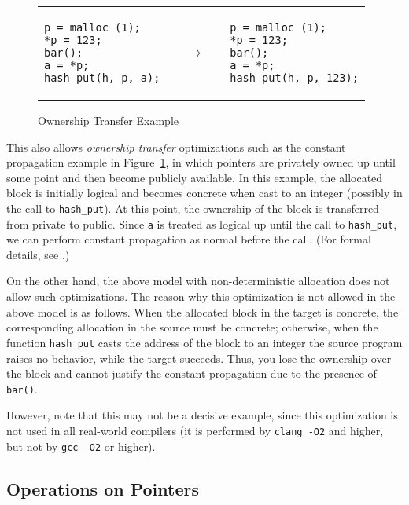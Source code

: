 \begin{figure}[t]
\center
\begin{tabular}{lll}
\begin{lstlisting}
p = malloc (1);
*p = 123;
bar();
a = *p;
hash_put(h, p, a);
\end{lstlisting}
&
$\quad\rightarrow\quad$
&
\begin{lstlisting}
p = malloc (1);
*p = 123;
bar();
a = *p;
hash_put(h, p, 123);
\end{lstlisting}
\end{tabular}
\caption{Ownership Transfer Example}\label{code:ownership}
\end{figure}

This also allows \emph{ownership transfer} optimizations such as the
constant propagation example in Figure~\ref{code:ownership}, in which
pointers are privately owned up until some point and then become
publicly available.  
In this example,
the allocated block is initially logical and becomes concrete when cast to an
integer (possibly in the call to \texttt{hash\_put}). At this point, the ownership of the block is transferred from
private to public. Since \texttt{a} is treated as logical up until the
call to \texttt{hash\_put}, we can perform constant propagation as
normal before the call. (For formal details, see .)

On the other hand, the above model with
non-deterministic allocation does not allow such optimizations.
The reason why this optimization is not allowed in the above model is
as follows.
When the allocated block in the target is concrete, the
  corresponding allocation in the source must be concrete; otherwise,
  when the function \texttt{hash\_put} casts the address of the block to
  an integer the source program raises no behavior, while the target succeeds.
Thus, you lose the ownership over the block and cannot justify the constant propagation due to the presence of \texttt{bar()}.


   However, note that this may not be a decisive example, since this
   optimization is not used in all real-world compilers (it is
   performed by \texttt{clang -O2} and higher, but not by \texttt{gcc
     -O2} or higher).

\subsection{Operations on Pointers}

